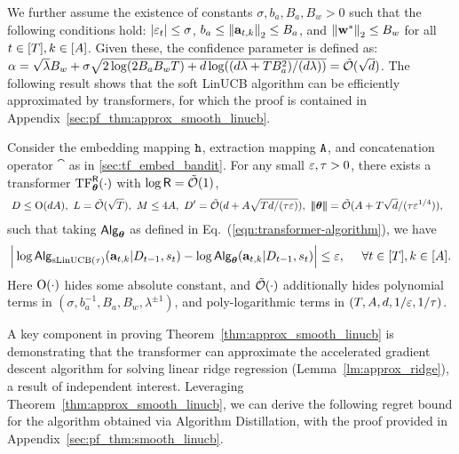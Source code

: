 We further assume the existence of constants $\sigma,b_a,B_a,B_w>0$ such that the following conditions hold:   $|{\varepsilon}_t|\leq\sigma$, $b_a\leq\left\|{{\mathbf a}_{t,k}}\right\|_2\leq B_a$, and $\left\|{{\mathbf w}^*}\right\|_2\le B_w$ for all $t\in[{T}],k\in[{A}]$. Given these, the confidence parameter is defined as: ${\alpha}=\sqrt{\lambda}B_w+\sigma\sqrt{2\log (2B_aB_w {T} )+d\log((d\lambda+{T} B_a^2)/(d\lambda))} = {\tilde{\mathcal O}}(\sqrt{d})$. The following result shows that the soft LinUCB algorithm can be efficiently approximated by transformers, for which the proof is contained in Appendix~\ref{sec:pf_thm:approx_smooth_linucb}.

\begin{theorem}\label{thm:approx_smooth_linucb}
Consider the embedding mapping ${\tt h}$, extraction mapping ${\tt A}$, and concatenation operator $\cat$ as in \ref{sec:tf_embed_bandit}. For any small $\varepsilon,{\tau}>0$, there exists a transformer ${\rm TF}_{\boldsymbol \theta}^{{\mathsf{R}}}(\cdot)$ with $\log {\mathsf{R}} = {\tilde{\mathcal O}}(1)$,
\begin{equation}
\begin{aligned}
&~D \le {\mathrm{O}}(d{A}),~ {L}=\tilde {\mathcal{O}}(\sqrt{{T}}),~ M \le 4{A},~D' = {\tilde{\mathcal O}}(d+A\sqrt{Td/({\tau}\varepsilon)}), ~{\left|\!\left|\!\left|{{{\boldsymbol \theta}}}\right|\!\right|\!\right|} = {\tilde{\mathcal O}}({A}+{T}\sqrt{d}/({\tau}\varepsilon^{1/4})), \label{eq:linucb_tf_param}
\end{aligned}
\end{equation}
such that taking ${\mathsf{Alg}}_{{{\boldsymbol \theta}}}$ as defined in Eq.~(\ref{eqn:transformer-algorithm}), we have
\[
\Big|\log {\mathsf{Alg}}_{{\mathrm{sLinUCB}}(\tau)}({\mathbf a}_{t,k}|{D}_{t-1},{s}_t) - \log {\mathsf{Alg}}_{{{\boldsymbol \theta}}}({\mathbf a}_{t,k}|{D}_{t-1},{s}_t) \Big|\leq \varepsilon, ~~~~\forall t\in[{T}],k\in[{A}].
\]
Here ${\mathrm{O}}(\cdot)$ hides some absolute constant, and  $\tilde {\mathcal{O}}(\cdot)$ additionally hides polynomial terms in $(\sigma, b_a^{-1}, B_a, B_w, \lambda^{\pm1})$, and poly-logarithmic terms in $({T}, {A}, d, 1/\varepsilon,1/{\tau})$.
\end{theorem}


A key component in proving Theorem~\ref{thm:approx_smooth_linucb} is demonstrating that the transformer can approximate the accelerated gradient descent algorithm for solving linear ridge regression (Lemma~\ref{lm:approx_ridge}), a result of independent interest. Leveraging Theorem~\ref{thm:approx_smooth_linucb}, we can derive the following regret bound for the algorithm obtained via Algorithm Distillation, with the proof provided in Appendix~\ref{sec:pf_thm:smooth_linucb}.

